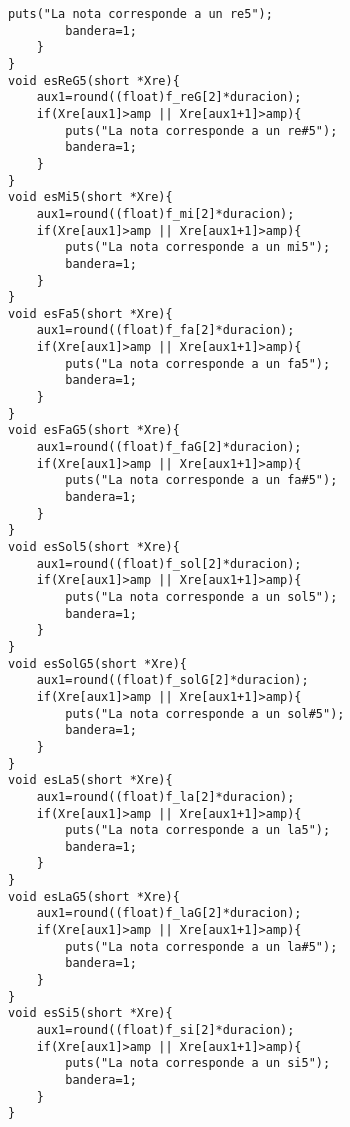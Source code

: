\begin{lstlisting}[style=CStyle]
		puts("La nota corresponde a un re5");
		bandera=1;
	}
}
void esReG5(short *Xre){
	aux1=round((float)f_reG[2]*duracion);
	if(Xre[aux1]>amp || Xre[aux1+1]>amp){
		puts("La nota corresponde a un re#5");
		bandera=1;
	}
}
void esMi5(short *Xre){
	aux1=round((float)f_mi[2]*duracion);
	if(Xre[aux1]>amp || Xre[aux1+1]>amp){
		puts("La nota corresponde a un mi5");
		bandera=1;
	}
}
void esFa5(short *Xre){
	aux1=round((float)f_fa[2]*duracion);
	if(Xre[aux1]>amp || Xre[aux1+1]>amp){
		puts("La nota corresponde a un fa5");
		bandera=1;
	}
}
void esFaG5(short *Xre){
	aux1=round((float)f_faG[2]*duracion);
	if(Xre[aux1]>amp || Xre[aux1+1]>amp){
		puts("La nota corresponde a un fa#5");
		bandera=1;
	}
}
void esSol5(short *Xre){
	aux1=round((float)f_sol[2]*duracion);
	if(Xre[aux1]>amp || Xre[aux1+1]>amp){
		puts("La nota corresponde a un sol5");
		bandera=1;
	}
}
void esSolG5(short *Xre){
	aux1=round((float)f_solG[2]*duracion);
	if(Xre[aux1]>amp || Xre[aux1+1]>amp){
		puts("La nota corresponde a un sol#5");
		bandera=1;
	}
}
void esLa5(short *Xre){
	aux1=round((float)f_la[2]*duracion);
	if(Xre[aux1]>amp || Xre[aux1+1]>amp){
		puts("La nota corresponde a un la5");
		bandera=1;
	}
}
void esLaG5(short *Xre){
	aux1=round((float)f_laG[2]*duracion);
	if(Xre[aux1]>amp || Xre[aux1+1]>amp){
		puts("La nota corresponde a un la#5");
		bandera=1;
	}
}
void esSi5(short *Xre){
	aux1=round((float)f_si[2]*duracion);
	if(Xre[aux1]>amp || Xre[aux1+1]>amp){
		puts("La nota corresponde a un si5");
		bandera=1;
	}
}
\end{lstlisting}